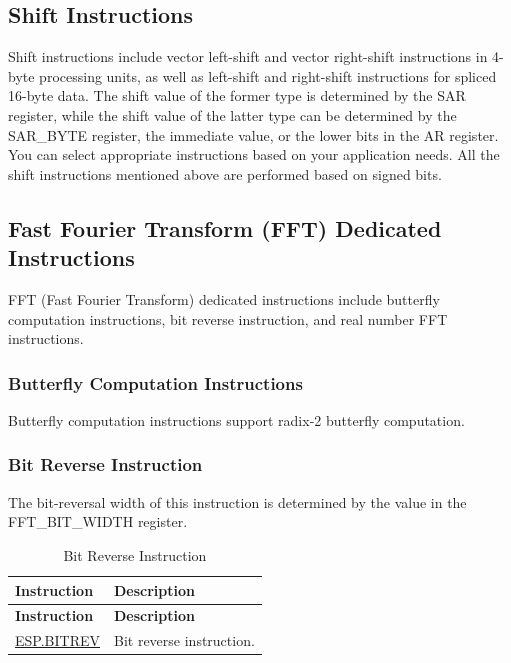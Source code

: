\documentclass[main\_\_EN.tex]{subfiles}
\begin{document}
\subsection{Shift Instructions}
\label{sec:pie-shift-instructions}

Shift instructions include vector left-shift and vector right-shift instructions in 4-byte processing units, as well as left-shift and right-shift instructions for spliced 16-byte data. The shift value of the former type is determined by the SAR register, while the shift value of the latter type can be determined by the SAR\_BYTE register, the immediate value, or the lower bits in the AR register. You can select appropriate instructions based on your application needs. All the shift instructions mentioned above are performed based on signed bits.



\subsection{Fast Fourier Transform (FFT) Dedicated Instructions}
\label{sec:pie-fft-instructions}

FFT (Fast Fourier Transform) dedicated instructions include butterfly computation instructions, bit reverse instruction, and real number FFT instructions.

\subsubsection{Butterfly Computation Instructions}

Butterfly computation instructions support radix-2 butterfly computation.



\subsubsection{Bit Reverse Instruction}

The bit-reversal width of this instruction is determined by the value in the FFT\_BIT\_WIDTH register.

\begin{longtable}[c]{|l|m{10cm}|}
    \caption{Bit Reverse Instruction}
    \label{tab:pie-bitrev-instructions}\\
    \hline
    \rowcolor{lightgray}
    \textbf{Instruction} & \textbf{Description} \\\hline
    \endfirsthead
    \rowcolor{lightgray}
    \textbf{Instruction} & \textbf{Description} \\\hline
    \endhead
    \endfoot

    \hyperref[instruction:ESPBITREV]{ESP.BITREV} & Bit reverse instruction.
    \\\hline
\end{longtable}
\end{document}
